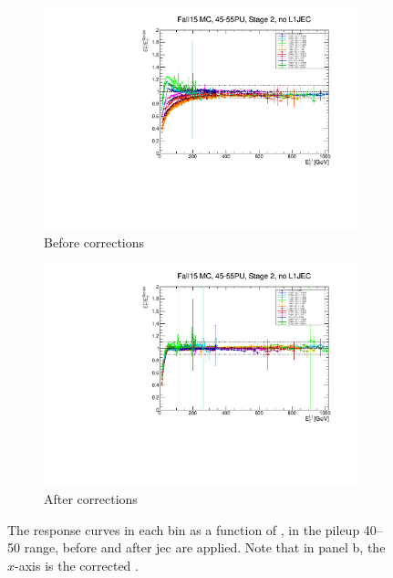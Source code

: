 \begin{figure}[htbp]
    \centering
    \begin{subfigure}[b]{0.45\textwidth}
        \includegraphics[width=\textwidth]{./figures/jecs/response_before.pdf}
        \caption{Before corrections}
        \label{fig:detector_jecs_response_before}
    \end{subfigure}
    \hfill
    \begin{subfigure}[b]{0.45\textwidth}
        \includegraphics[width=\textwidth]{./figures/jecs/response_after.pdf}
        \caption{After corrections}
        \label{fig:detector_jecs_response_after}
    \end{subfigure}
\caption[The response curves in each \abseta bin as a function of \ptLOne, in the pileup 40--50 range, before and after jet energy corrections are applied]{The response curves in each \abseta bin as a function of \ptLOne, in the \gls{pileup} 40--50 range, before and after \gls{jec} are applied. Note that in panel b, the $x$-axis is the corrected \ptLOne.}
\label{fig:detector_jecs_response}
\end{figure}


